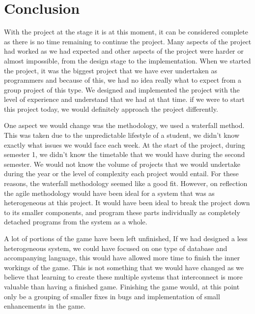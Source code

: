 
\chapter{Conclusion}

With the project at the stage it is at this moment, it can be considered complete as there is no time remaining to continue the project. Many aspects of the project had worked as we had expected and other aspects of the project were harder or almost impossible, from the design stage to the implementation.
When we started the project, it was the biggest project that we have ever undertaken as programmers and because of this, we had no idea really what to expect from a group project of this type. We designed and implemented the project with the level of experience and understand that we had at that time. if we were to start this project today, we would definitely approach the project differently.\newline

One aspect we would change was the methodology, we used a waterfall method. This was taken due to the unpredictable lifestyle of a student, we didn't know exactly what issues we would face each week. At the start of the project, during semester 1, we didn't know the timetable that we would have during the second semester. We would not know the volume of projects that we would undertake during the year or the level of complexity each project would entail. For these reasons, the waterfall methodology seemed like a good fit. However, on reflection the agile methodology would have been ideal for a system that was as heterogeneous at this project. It would have been ideal to break the project down to its smaller components, and program these parts individually as completely detached programs from the system as a whole.\newline

A lot of portions of the game have been left unfinished, If we had designed a less heterogeneous system, we could have focused on one type of database and accompanying language, this would have allowed more time to finish the inner workings of the game. This is not something that we would have changed as we believe that learning to create these multiple systems that interconnect is more valuable than having a finished game. Finishing the game would, at this point only be a grouping of smaller fixes in bugs and implementation of small enhancements in the game.\newline